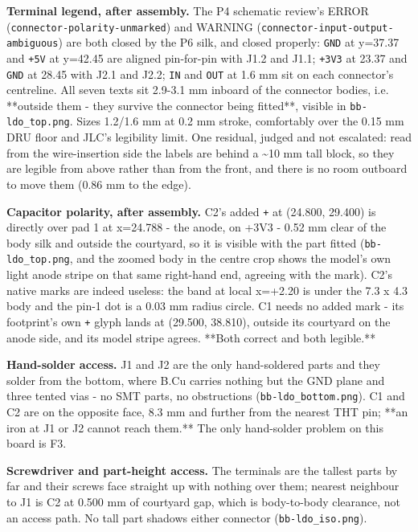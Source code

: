\documentclass[11pt,a4paper]{article}
\begin{document}
\textbf{Terminal legend, after assembly.} The P4 schematic review's ERROR (\texttt{connector-polarity-unmarked}) and WARNING (\texttt{connector-input-output-ambiguous}) are both closed by the P6 silk, and closed properly: \texttt{GND} at y=37.37 and \texttt{+5V} at y=42.45 are aligned pin-for-pin with J1.2 and J1.1; \texttt{+3V3} at 23.37 and \texttt{GND} at 28.45 with J2.1 and J2.2; \texttt{IN} and \texttt{OUT} at 1.6 mm sit on each connector's centreline. All seven texts sit 2.9-3.1 mm inboard of the connector bodies, i.e. {*}{*}outside them - they survive the connector being fitted{*}{*}, visible in \texttt{bb-ldo\_top.png}. Sizes 1.2/1.6 mm at 0.2 mm stroke, comfortably over the 0.15 mm DRU floor and JLC's legibility limit. One residual, judged and not escalated: read from the wire-insertion side the labels are behind a \textasciitilde{}10 mm tall block, so they are legible from above rather than from the front, and there is no room outboard to move them (0.86 mm to the edge).

\textbf{Capacitor polarity, after assembly.} C2's added \texttt{+} at (24.800, 29.400) is directly over pad 1 at x=24.788 - the anode, on +3V3 - 0.52 mm clear of the body silk and outside the courtyard, so it is visible with the part fitted (\texttt{bb-ldo\_top.png}, and the zoomed body in the centre crop shows the model's own light anode stripe on that same right-hand end, agreeing with the mark). C2's native marks are indeed useless: the band at local x=+2.20 is under the 7.3 x 4.3 body and the pin-1 dot is a 0.03 mm radius circle. C1 needs no added mark - its footprint's own \texttt{+} glyph lands at (29.500, 38.810), outside its courtyard on the anode side, and its model stripe agrees. {*}{*}Both correct and both legible.{*}{*}

\textbf{Hand-solder access.} J1 and J2 are the only hand-soldered parts and they solder from the bottom, where B.Cu carries nothing but the GND plane and three tented vias - no SMT parts, no obstructions (\texttt{bb-ldo\_bottom.png}). C1 and C2 are on the opposite face, 8.3 mm and further from the nearest THT pin; {*}{*}an iron at J1 or J2 cannot reach them.{*}{*} The only hand-solder problem on this board is F3.

\textbf{Screwdriver and part-height access.} The terminals are the tallest parts by far and their screws face straight up with nothing over them; nearest neighbour to J1 is C2 at 0.500 mm of courtyard gap, which is body-to-body clearance, not an access path. No tall part shadows either connector (\texttt{bb-ldo\_iso.png}).
\end{document}
